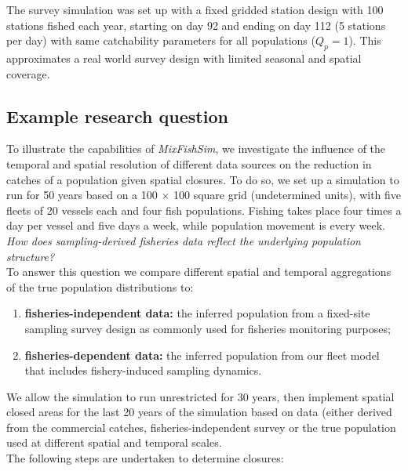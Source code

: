 \documentclass[review]{elsarticle}
\begin{document}
The survey simulation was set up with a fixed gridded station design with 100
stations fished each year, starting on day 92 and ending on day 112 (5 stations
per day) with same catchability parameters for all populations ($Q_{p} = 1$).
This approximates a real world survey design with limited seasonal and spatial
coverage. 

\subsection{Example research question}

To illustrate the capabilities of \textit{MixFishSim}, we investigate the
influence of the temporal and spatial resolution of different data sources on
the reduction in catches of a population given spatial closures. To do so, we
set up a simulation to run for 50 years based on a 100 $\times$ 100 square grid
(undetermined units), with five fleets of 20 vessels each and four fish
populations. Fishing takes place four times a day per vessel and five days a
week, while population movement is every week. \\

\textit{How does sampling-derived fisheries data reflect the underlying
	population structure?} \\

To answer this question we compare different spatial and temporal aggregations
of the true population distributions to:
\begin{enumerate}[label=\alph*)]
	\item \textbf{fisheries-independent data:} the inferred population from
		a fixed-site sampling survey design as commonly used for
		fisheries monitoring purposes;
	\item \textbf{fisheries-dependent data:} the inferred population from
		our fleet model that includes fishery-induced sampling
		dynamics.
\end{enumerate}

We allow the simulation to run unrestricted for 30 years, then implement
spatial closed areas for the last 20 years of the simulation based on data
(either derived from the commercial catches, fisheries-independent survey or
the true population used at different spatial and temporal scales. \\

The following steps are undertaken to determine closures:
\end{document}

